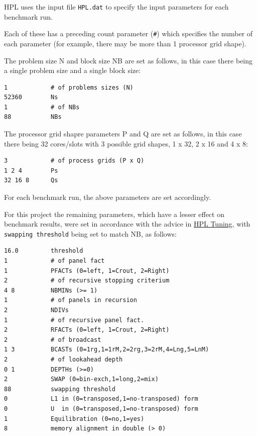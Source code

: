\documentclass{report}
\begin{document}
HPL uses the input file \verb|HPL.dat| to specify the input parameters for each benchmark run.

Each of these has a preceding count parameter (\verb|#|) which specifies the number of each parameter (for example, there may be more than 1 processor grid shape).

The problem size N and block size NB are set as follows, in this case there being a single problem size and a single block size:

\lstset{style=listing}
\begin{lstlisting}[numbers=none, caption=HPL.dat]
1            # of problems sizes (N)
52360        Ns
1            # of NBs
88           NBs
\end{lstlisting}

The processor grid shapre parameters P and Q are set as follows, in this case there being 32 cores/slots with 3 possible grid shapes, 1 x 32, 2 x 16 and 4 x 8:

\lstset{style=listing}
\begin{lstlisting}[numbers=none, caption=HPL.dat]
3            # of process grids (P x Q)
1 2 4        Ps
32 16 8      Qs
\end{lstlisting}

For each benchmark run, the above parameters are set accordingly.

For this project the remaining parameters, which have a lesser effect on benchmark results, were set in accordance with the advice in \href{https://www.netlib.org/benchmark/hpl/tuning.html}{HPL Tuning}, with \verb|swapping threshold| being set to match NB, as follows:

\lstset{style=listing}
\begin{lstlisting}[numbers=none, caption=HPL.dat]
16.0         threshold
1            # of panel fact
1            PFACTs (0=left, 1=Crout, 2=Right)
2            # of recursive stopping criterium
4 8          NBMINs (>= 1)
1            # of panels in recursion
2            NDIVs
1            # of recursive panel fact.
2            RFACTs (0=left, 1=Crout, 2=Right)
2            # of broadcast
1 3          BCASTs (0=1rg,1=1rM,2=2rg,3=2rM,4=Lng,5=LnM)
2            # of lookahead depth
0 1          DEPTHs (>=0)
2            SWAP (0=bin-exch,1=long,2=mix)
88           swapping threshold
0            L1 in (0=transposed,1=no-transposed) form
0            U  in (0=transposed,1=no-transposed) form
1            Equilibration (0=no,1=yes)
8            memory alignment in double (> 0)
\end{lstlisting}
\end{document}
